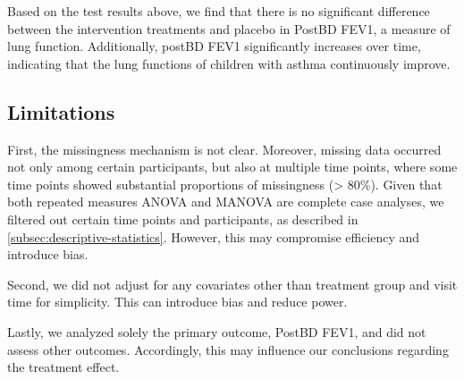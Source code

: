 \documentclass[12pt]{article}
\begin{document}
Based on the test results above, we find that
there is no significant difference between the
intervention treatments and placebo in PostBD FEV1,
a measure of lung function. 
Additionally, postBD FEV1 significantly increases over time,
indicating that the lung functions of children with asthma
continuously improve.

\subsection{Limitations}
First, the missingness mechanism is not clear.
Moreover, missing data occurred not only among
certain participants, but also at multiple time points,
where some time points showed substantial proportions
of missingness (> 80\%).
Given that both repeated measures ANOVA and MANOVA are complete case analyses,
we filtered out certain time points and participants, as described
in \cref{subsec:descriptive-statistics}.
However, this may compromise efficiency and introduce bias.

Second, we did not adjust for any covariates other than treatment group
and visit time for simplicity. This can introduce bias and reduce power.

Lastly, we analyzed solely the primary outcome, PostBD FEV1, and
did not assess other outcomes. Accordingly, this may 
influence our conclusions regarding the treatment effect.
\end{document}
